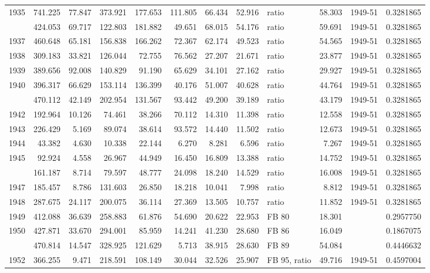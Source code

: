 \documentclass[
  english,
  a4paper,
]{article}
\begin{document}
\begin{longtable}[t]{rrrrrrrrlrlr}
1935 & 741.225 & 77.847 & 373.921 & 177.653 & 111.805 & 66.434 & 52.916 & ratio & 58.303 & 1949-51 & 0.3281865\\
\addlinespace
1936 & 424.053 & 69.717 & 122.803 & 181.882 & 49.651 & 68.015 & 54.176 & ratio & 59.691 & 1949-51 & 0.3281865\\
1937 & 460.648 & 65.181 & 156.838 & 166.262 & 72.367 & 62.174 & 49.523 & ratio & 54.565 & 1949-51 & 0.3281865\\
1938 & 309.183 & 33.821 & 126.044 & 72.755 & 76.562 & 27.207 & 21.671 & ratio & 23.877 & 1949-51 & 0.3281865\\
1939 & 389.656 & 92.008 & 140.829 & 91.190 & 65.629 & 34.101 & 27.162 & ratio & 29.927 & 1949-51 & 0.3281865\\
1940 & 396.317 & 66.629 & 153.114 & 136.399 & 40.176 & 51.007 & 40.628 & ratio & 44.764 & 1949-51 & 0.3281865\\
\addlinespace
1941 & 470.112 & 42.149 & 202.954 & 131.567 & 93.442 & 49.200 & 39.189 & ratio & 43.179 & 1949-51 & 0.3281865\\
1942 & 192.964 & 10.126 & 74.461 & 38.266 & 70.112 & 14.310 & 11.398 & ratio & 12.558 & 1949-51 & 0.3281865\\
1943 & 226.429 & 5.169 & 89.074 & 38.614 & 93.572 & 14.440 & 11.502 & ratio & 12.673 & 1949-51 & 0.3281865\\
1944 & 43.382 & 4.630 & 10.338 & 22.144 & 6.270 & 8.281 & 6.596 & ratio & 7.267 & 1949-51 & 0.3281865\\
1945 & 92.924 & 4.558 & 26.967 & 44.949 & 16.450 & 16.809 & 13.388 & ratio & 14.752 & 1949-51 & 0.3281865\\
\addlinespace
1946 & 161.187 & 8.714 & 79.597 & 48.777 & 24.098 & 18.240 & 14.529 & ratio & 16.008 & 1949-51 & 0.3281865\\
1947 & 185.457 & 8.786 & 131.603 & 26.850 & 18.218 & 10.041 & 7.998 & ratio & 8.812 & 1949-51 & 0.3281865\\
1948 & 287.675 & 24.117 & 200.075 & 36.114 & 27.369 & 13.505 & 10.757 & ratio & 11.852 & 1949-51 & 0.3281865\\
1949 & 412.088 & 36.639 & 258.883 & 61.876 & 54.690 & 20.622 & 22.953 & FB 80 & 18.301 &  & 0.2957750\\
1950 & 427.871 & 33.670 & 294.001 & 85.959 & 14.241 & 41.230 & 28.680 & FB 86 & 16.049 &  & 0.1867075\\
\addlinespace
1951 & 470.814 & 14.547 & 328.925 & 121.629 & 5.713 & 38.915 & 28.630 & FB 89 & 54.084 &  & 0.4446632\\
1952 & 366.255 & 9.471 & 218.591 & 108.149 & 30.044 & 32.526 & 25.907 & FB 95, ratio & 49.716 & 1949-51 & 0.4597004\\

\end{longtable}
\end{document}
